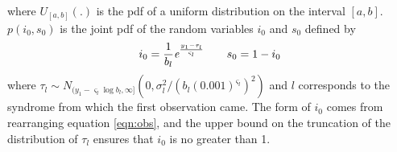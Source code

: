 \documentclass{article}
\begin{document}
\noindent where $U_{[a,b]}(.)$ is the pdf of a uniform distribution on the interval $[a,b]$.  $p(i_0,s_0)$ is the joint pdf of the random variables $i_0$ and $s_0$ defined by
\[i_0 = \frac{1}{b_l} \emph{e}^{\frac{y_1-\tau_l}{\varsigma_l}} \qquad s_0 = 1 - i_0 \]
where $\tau_l \sim N_{(y_1 - \varsigma_l \log b_l,\infty]}(0,\sigma_l^2 / (b_l(0.001)^{\varsigma_l})^2)$ and $l$ corresponds to the syndrome from which the first observation came.  The form of $i_0$ comes from rearranging equation \eqref{eqn:obs}, and the upper bound on the truncation of the distribution of $\tau_l$ ensures that $i_0$ is no greater than 1.


\end{document}
